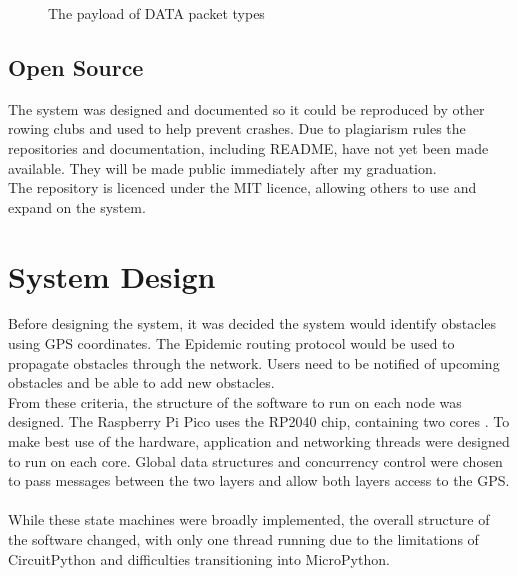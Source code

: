\documentclass[12pt,a4paper]{report}
\begin{document}
\begin{figure}[h]
\begin{center}
\end{center}
\caption{The payload of DATA packet types}
\end{figure}
\FloatBarrier

\subsection{Open Source}
The system was designed and documented so it could be reproduced by other rowing clubs and used to help prevent crashes. Due to plagiarism rules the repositories and documentation, including README, have not yet been made available. They will be made public immediately after my graduation. \\
The repository is licenced under the MIT licence, allowing others to use and expand on the system. \\


\section{System Design}
Before designing the system, it was decided the system would identify obstacles using GPS coordinates. The Epidemic routing protocol would be used to propagate obstacles through the network. Users need to be notified of upcoming obstacles and be able to add new obstacles. \\
From these criteria, the structure of the software to run on each node was designed. The Raspberry Pi Pico uses the RP2040 chip, containing two cores \cite{rp2040}. To make best use of the hardware, application and networking threads were designed to run on each core. Global data structures and concurrency control were chosen to pass messages between the two layers and allow both layers access to the GPS. \\ \\
While these state machines were broadly implemented, the overall structure of the software changed, with only one thread running due to the limitations of CircuitPython and difficulties transitioning into MicroPython. \\
\end{document}
